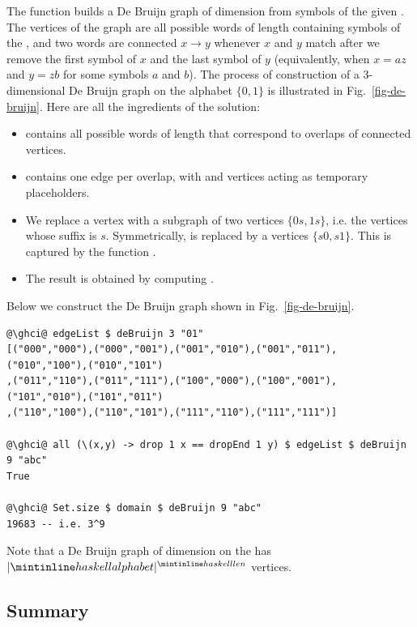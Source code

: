 The function builds a De Bruijn graph of dimension  from symbols of the given
. The vertices of the graph are all possible words of length 
containing symbols of the , and two words are connected $x \rightarrow y$
whenever $x$ and $y$ match after we remove the first symbol of $x$ and the last symbol
of $y$ (equivalently, when $x = az$ and $y = zb$ for some symbols $a$ and $b$).
The process of construction of a 3-dimensional De Bruijn graph on the alphabet
$\{0, 1\}$ is illustrated in Fig.~\ref{fig-de-bruijn}. Here are all the ingredients
of the solution:
\begin{itemize}
    \item {} contains all possible words of length  that
    correspond to overlaps of connected vertices.
    \item {} contains one edge per overlap, with  and
     vertices acting as temporary placeholders.
    \item We replace a vertex  with a subgraph of two vertices
    $\{0s, 1s\}$, i.e. the vertices whose suffix is $s$. Symmetrically,
     is replaced by a vertices $\{s0, s1\}$. This is captured
    by the function .
    \item The result is obtained by computing   .
\end{itemize}

Below we construct the De Bruijn graph shown in Fig.~\ref{fig-de-bruijn}.
\begin{verbatim}
@\ghci@ edgeList $ deBruijn 3 "01"
[("000","000"),("000","001"),("001","010"),("001","011"),("010","100"),("010","101")
,("011","110"),("011","111"),("100","000"),("100","001"),("101","010"),("101","011")
,("110","100"),("110","101"),("111","110"),("111","111")]

@\ghci@ all (\(x,y) -> drop 1 x == dropEnd 1 y) $ edgeList $ deBruijn 9 "abc"
True

@\ghci@ Set.size $ domain $ deBruijn 9 "abc"
19683 -- i.e. 3^9
\end{verbatim}

\noindent
Note that a De Bruijn graph of dimension  on the  has
$|\hs{alphabet}|^{\hs{len}}$ vertices.

\subsection{Summary}\label{sub-library-summary}

